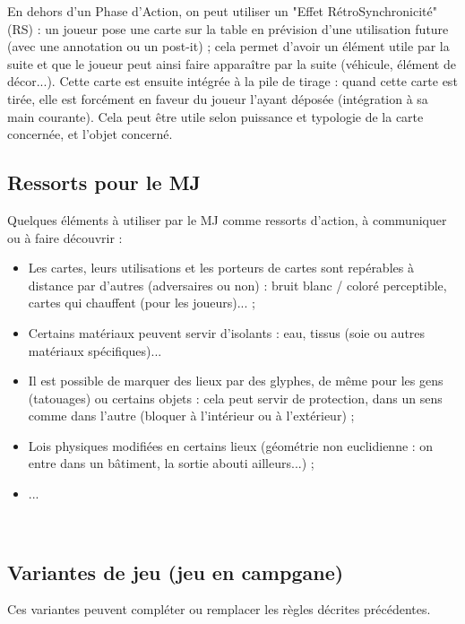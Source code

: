 \documentclass[11pt,twoside,a4paper]{article}
\begin{document}
En dehors d'un Phase d'Action, on peut utiliser un "Effet R{\'e}troSynchronicit{\'e}" (RS) : un joueur pose une carte sur la table en pr{\'e}vision d'une utilisation future (avec une annotation ou un post-it) ; cela permet d'avoir un {\'e}l{\'e}ment utile par la suite et que le joueur peut ainsi faire appara{\^i}tre par la suite (v{\'e}hicule, {\'e}l{\'e}ment de d{\'e}cor...). Cette carte est ensuite int{\'e}gr{\'e}e {\`a} la pile de tirage : quand cette carte est tir{\'e}e, elle est forc{\'e}ment en faveur du joueur l'ayant d{\'e}pos{\'e}e (int{\'e}gration {\`a} sa main courante). Cela peut {\^e}tre utile selon puissance et typologie de la carte concern{\'e}e, et l'objet concern{\'e}.~\\

\subsection{Ressorts pour le MJ}

Quelques {\'e}l{\'e}ments {\`a} utiliser par le MJ comme ressorts d'action, {\`a} communiquer ou {\`a} faire d{\'e}couvrir : 
\begin{itemize}
	\item Les cartes, leurs utilisations et les porteurs de cartes sont rep{\'e}rables {\`a} distance par d'autres (adversaires ou non) : bruit blanc / color{\'e} perceptible, cartes qui chauffent (pour les joueurs)... ; 
	\item Certains mat{\'e}riaux peuvent servir d'isolants : eau, tissus (soie ou autres mat{\'e}riaux sp{\'e}cifiques)...
	\item Il est possible de marquer des lieux par des glyphes, de m{\^e}me pour les gens (tatouages) ou certains objets : cela peut servir de protection, dans un sens comme dans l'autre (bloquer {\`a} l'int{\'e}rieur ou {\`a} l'ext{\'e}rieur) ; 
	\item Lois physiques modifiées en certains lieux (géométrie non euclidienne : on entre dans un bâtiment, la sortie abouti ailleurs...) ; 
	\item ... 
\end{itemize}~\\

\subsection{Variantes de jeu (jeu en campgane)}

Ces variantes peuvent compl{\'e}ter ou remplacer les r{\`e}gles d{\'e}crites pr{\'e}c{\'e}dentes.~\\
\end{document}
